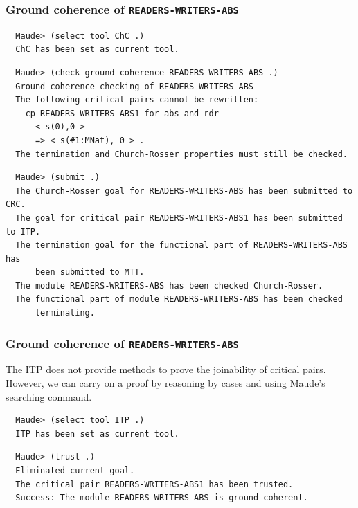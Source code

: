 \documentclass[xcolor=dvipsnames,10pt]{beamer}
\begin{document}
\begin{frame}[fragile]
  \frametitle{Ground coherence of \verb~READERS-WRITERS-ABS~}

\begin{scriptsize}
\begin{verbatim}
  Maude> (select tool ChC .)
  ChC has been set as current tool.
\end{verbatim}
\end{scriptsize}

\begin{scriptsize}
\begin{verbatim}
  Maude> (check ground coherence READERS-WRITERS-ABS .)
  Ground coherence checking of READERS-WRITERS-ABS
  The following critical pairs cannot be rewritten:
    cp READERS-WRITERS-ABS1 for abs and rdr-
      < s(0),0 >
      => < s(#1:MNat), 0 > .
  The termination and Church-Rosser properties must still be checked.
\end{verbatim}
\end{scriptsize}

\begin{scriptsize}
\begin{verbatim}
  Maude> (submit .)
  The Church-Rosser goal for READERS-WRITERS-ABS has been submitted to CRC.
  The goal for critical pair READERS-WRITERS-ABS1 has been submitted to ITP.
  The termination goal for the functional part of READERS-WRITERS-ABS has 
      been submitted to MTT.
  The module READERS-WRITERS-ABS has been checked Church-Rosser.
  The functional part of module READERS-WRITERS-ABS has been checked 
      terminating.
\end{verbatim}
\end{scriptsize}

\end{frame}
\begin{frame}[fragile]
  \frametitle{Ground coherence of \verb~READERS-WRITERS-ABS~}

The ITP does not provide methods to prove the joinability of critical pairs. 
However, we can carry on a proof by reasoning by cases and using Maude's searching 
command. 

\begin{scriptsize}
\begin{verbatim}
  Maude> (select tool ITP .)
  ITP has been set as current tool.
\end{verbatim}
\end{scriptsize}

\begin{scriptsize}
\begin{verbatim}
  Maude> (trust .)
  Eliminated current goal.
  The critical pair READERS-WRITERS-ABS1 has been trusted.
  Success: The module READERS-WRITERS-ABS is ground-coherent.
\end{verbatim}
\end{scriptsize}

\end{frame}
\end{document}
